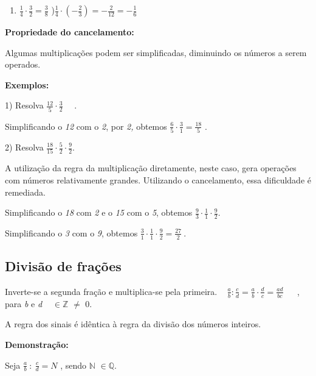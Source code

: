 \begin{enumerate}
	\item  \( \frac{1}{4} \cdot \frac{3}{2}=\frac{3}{8} \) \quad \quad {}){\fontsize{16pt}{19.2pt}\selectfont   \( \frac{1}{4} \cdot  \left( -\frac{2}{3} \right) =-\frac{2}{12}=-\frac{1}{6} \) }
\end{enumerate}

\textbf{Propriedade do cancelamento:}

Algumas multiplicações podem ser simplificadas, diminuindo os números a serem operados.

\textbf{Exemplos: }

1) Resolva \( \frac{12}{5} \cdot \frac{3}{2}\text{~~~ .} \) 

Simplificando o \textit{12} com o \textit{2}, por \textit{2,} obtemos   \( \frac{6}{5} \cdot \frac{3}{1}=\frac{18}{5} \) {\fontsize{16pt}{19.2pt}\selectfont .}

2) Resolva \( \frac{18}{15} \cdot \frac{5}{2} \cdot \frac{9}{2}\text{.} \)

\begin{justify}
A utilização da regra da multiplicação diretamente, neste caso, gera operações com números relativamente grandes. Utilizando o cancelamento, essa dificuldade é remediada.
\end{justify}

Simplificando o \textit{18} com \textit{2} e o \textit{15} com o \textit{5}, obtemos  \( \frac{9}{3} \cdot \frac{1}{1} \cdot \frac{9}{2}. \) 

Simplificando o \textit{3} com o \textit{9}, obtemos  \( \frac{3}{1} \cdot \frac{1}{1} \cdot \frac{9}{2}=\frac{27}{2}~. \) \quad 

\subsection{Divisão de frações}

\begin{caixa}
\quad Inverte-se a segunda fração e multiplica-se pela primeira.
~ \quad \quad  \( \frac{a}{b}:\frac{c}{d}=\frac{a}{b} \cdot \frac{d}{c}=\frac{ad}{bc}~~ \) ~ , para \textit{b} e \textit{d} \textit{~  \( \in \mathbb{Z} \) }  $ \neq $   0.
\end{caixa}
A regra dos sinais é idêntica à regra da divisão dos números inteiros.

\textbf{Demonstração: }

Seja \( \frac{a}{b}~:~\frac{c}{d}=N \) , sendo $\mathbb{N}$  \( \in \mathbb{Q} \).

